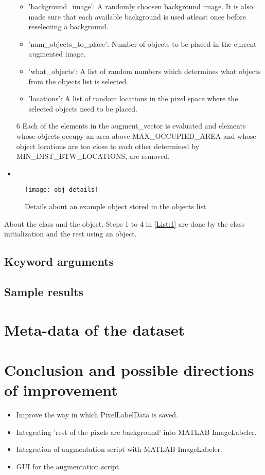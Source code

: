 \documentclass[paper=a4,11pt,parskip=half,toc=listof]{scrartcl}
\begin{document}
\begin{itemize}
\begin{itemize}
				\item 'background\_image': A randomly choosen background image. It is also made sure that each available background is used atleast once before reselecting a background.
				\item 'num\_objects\_to\_place': Number of objects to be placed in the current augmented image.
				\item 'what\_objects': A list of random numbers which determines what objects from the objects list is selected.
				\item 'locations': A list of random locations in the pixel space where the selected objects need to be placed.
			\end{itemize}
		\item[6] Each of the elements in the augment\_vector is evaluated and elements whose objects occupy an area above MAX\_OCCUPIED\_AREA and whose object locations are too close to each other determined by MIN\_DIST\_BTW\_LOCATIONS, are removed.
		\item 
	\end{itemize}
	
	\begin{figure}[htb!]
		\centering
		\texttt{[image: obj\_details]}
		\caption{Details about an example object stored in the objects list}
		\label{Fig:7}
	\end{figure}
	
About the class and the object. Steps 1 to 4 in \ref{List:1} are done by the class initialization and the rest using an object.
	
\subsection{Keyword arguments}

\subsection{Sample results}

\section{Meta-data of the dataset}



\section{Conclusion and possible directions of improvement}
	\begin{itemize}
		\item Improve the way in which PixelLabelData is saved.
		\item Integrating 'rest of the pixels are background' into MATLAB ImageLabeler.
		\item Integration of augmentation script with MATLAB ImageLabeler.
		\item GUI for the augmentation script.
	\end{itemize}

\newpage
{}
\begin{thebibliography}{9}

\end{thebibliography}
\end{document}
